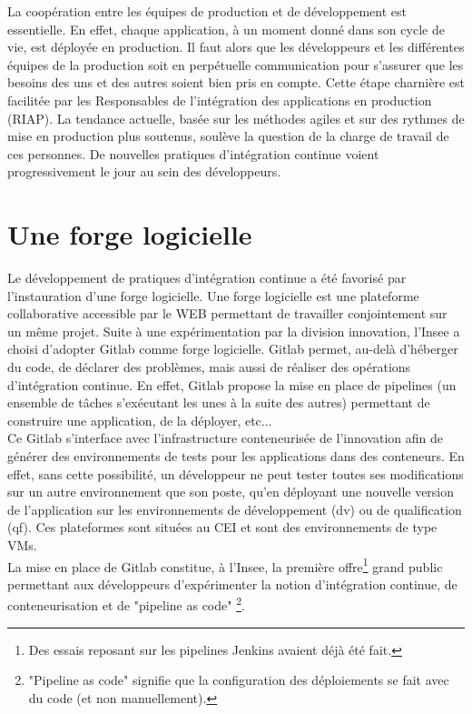 \documentclass[11pt,fleqn]{book} %
\begin{document}
 La coopération entre les équipes de production et de développement est essentielle. En effet, chaque application, à un moment donné dans son cycle de vie, est déployée en production. Il faut alors que les développeurs et les différentes équipes de la production soit en perpétuelle communication pour s'assurer que les besoins des uns et des autres soient bien pris en compte. Cette étape charnière est facilitée par les Responsables de l’intégration des applications en production (RIAP). La tendance actuelle, basée sur les méthodes agiles et sur des rythmes de mise en production plus soutenus,  soulève la question de la charge de travail de ces personnes. De nouvelles pratiques d'intégration continue voient progressivement le jour au sein des développeurs.\newline
\vspace{-0.5cm}
\section{Une forge logicielle}
Le développement de pratiques d'intégration continue a été favorisé par l'instauration d'une forge logicielle. Une forge logicielle est une plateforme collaborative accessible par le WEB permettant de travailler conjointement sur un même projet. Suite à une expérimentation par la division innovation,  l'Insee a choisi d'adopter Gitlab comme forge logicielle. Gitlab permet, au-delà d'héberger du code, de déclarer des problèmes, mais aussi de réaliser des opérations d'intégration continue. En effet, Gitlab propose la mise en place de pipelines (un ensemble de tâches s'exécutant les unes à la suite des autres) permettant de construire une application, de la déployer, etc...\\

Ce Gitlab s'interface avec l'infrastructure conteneurisée de l'innovation afin de générer des environnements de tests pour les applications dans des conteneurs. En effet, sans cette possibilité, un développeur ne peut tester toutes ses modifications sur un autre environnement que son poste, qu'en déployant une nouvelle version de l'application sur les environnements de développement (dv) ou de qualification (qf). Ces plateformes sont situées au CEI et sont des environnements de type VMs.\\

La mise en place de Gitlab constitue, à l'Insee, la première offre\footnote{Des essais reposant sur les pipelines Jenkins avaient déjà été fait.} grand public permettant aux développeurs d'expérimenter la notion d'intégration continue, de conteneurisation et de "pipeline as code"
\footnote{"Pipeline as code" signifie que la configuration des déploiements se fait avec du code (et non manuellement).}.\newline
\end{document}
